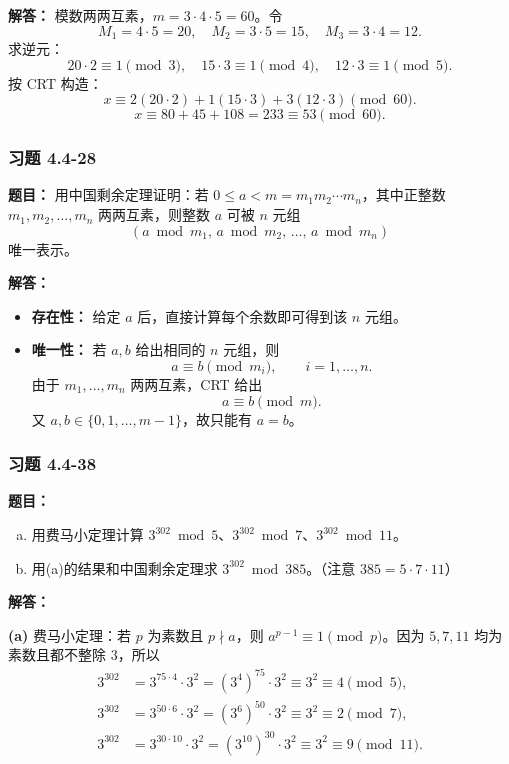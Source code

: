 \documentclass[11pt,UTF8]{article}
\begin{document}
\textbf{解答：} 模数两两互素，$m=3\cdot 4\cdot 5=60$。令
\[ M_1=4\cdot 5=20,\quad M_2=3\cdot 5=15,\quad M_3=3\cdot 4=12. \]
求逆元：
\[ 20\cdot 2\equiv 1\pmod 3,\quad 15\cdot 3\equiv 1\pmod 4,\quad 12\cdot 3\equiv 1\pmod 5. \]
按 CRT 构造：
\[ x \equiv 2(20\cdot 2)+1(15\cdot 3)+3(12\cdot 3) \pmod{60}. \]
\[ x \equiv 80+45+108 = 233 \equiv \boxed{53\pmod{60}}. \]

\subsubsection*{习题 4.4-28}
\textbf{题目：} 用中国剩余定理证明：若 $0\le a<m=m_1m_2\cdots m_n$，其中正整数 $m_1,m_2,\dots,m_n$ 两两互素，则整数 $a$ 可被 $n$ 元组
\[ (a\bmod m_1,\,a\bmod m_2,\,\dots,\,a\bmod m_n) \]
唯一表示。

\textbf{解答：}
\begin{itemize}
    \item \textbf{存在性：} 给定 $a$ 后，直接计算每个余数即可得到该 $n$ 元组。
    \item \textbf{唯一性：} 若 $a,b$ 给出相同的 $n$ 元组，则
    \[ a\equiv b\pmod{m_i},\qquad i=1,\dots,n. \]
    由于 $m_1,\dots,m_n$ 两两互素，CRT 给出
    \[ a\equiv b\pmod m. \]
    又 $a,b\in\{0,1,\dots,m-1\}$，故只能有 $a=b$。
\end{itemize}

\subsubsection*{习题 4.4-38}
\textbf{题目：}
\begin{enumerate}[a)]
    \item 用费马小定理计算 $3^{302}\bmod 5$、$3^{302}\bmod 7$、$3^{302}\bmod 11$。
    \item 用(a)的结果和中国剩余定理求 $3^{302}\bmod 385$。（注意 $385=5\cdot 7\cdot 11$）
\end{enumerate}

\textbf{解答：}

\textbf{(a)} 费马小定理：若 $p$ 为素数且 $p\nmid a$，则 $a^{p-1}\equiv 1\pmod p$。因为 $5,7,11$ 均为素数且都不整除 $3$，所以
\begin{align*}
3^{302} &= 3^{75\cdot 4}\cdot 3^2 = (3^4)^{75}\cdot 3^2 \equiv 3^2 \equiv \boxed{4\pmod 5},\\
3^{302} &= 3^{50\cdot 6}\cdot 3^2 = (3^6)^{50}\cdot 3^2 \equiv 3^2 \equiv \boxed{2\pmod 7},\\
3^{302} &= 3^{30\cdot 10}\cdot 3^2 = (3^{10})^{30}\cdot 3^2 \equiv 3^2 \equiv \boxed{9\pmod{11}}.
\end{align*}
\end{document}
